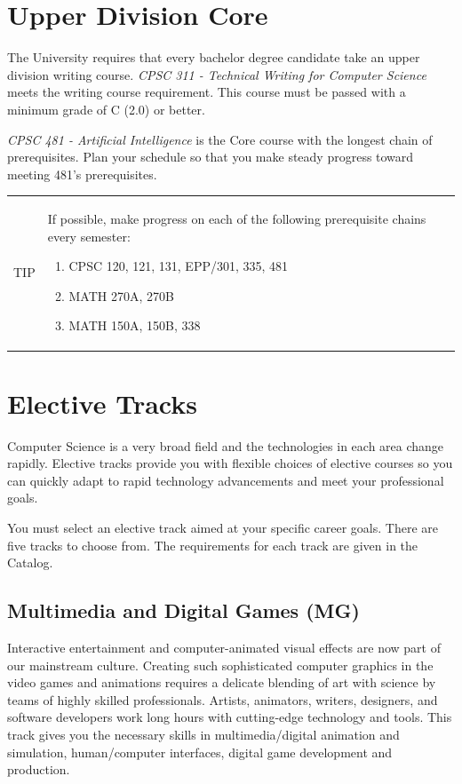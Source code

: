 \documentclass{book}
\newenvironment{tip}{
  \tcolorbox \begin{tabular}{m{.5in} m{5.25in}}
    \Large{TIP} &
}{
  \end{tabular} \endtcolorbox
}
\newcommand{\MgTrackName}{Multimedia and Digital Games (MG)}
\begin{document}
\section{Upper Division Core}

The University requires that every bachelor degree candidate take an upper division writing course. \emph{CPSC 311 - Technical Writing for Computer Science} meets the writing course requirement. This course must be passed with a minimum grade of C (2.0) or better.

\emph{CPSC 481 - Artificial Intelligence} is the Core course with the longest chain of prerequisites. Plan your schedule so that you make steady progress toward meeting 481's prerequisites.

\begin{tip}
  If possible, make progress on each of the following prerequisite chains every semester:
  \begin{enumerate}
  \item CPSC 120, 121, 131, EPP/301, 335, 481
  \item MATH 270A, 270B
  \item MATH 150A, 150B, 338
  \end{enumerate}
\end{tip}

\section{Elective Tracks}
 
Computer Science is a very broad field and the technologies in each area change rapidly. Elective tracks provide you with flexible choices of elective courses so you can quickly adapt to rapid technology advancements and meet your professional goals.

You must select an elective track aimed at your specific career goals. There are five tracks to choose from. The requirements for each track are given in the Catalog.

\subsection{\MgTrackName}
\MgTrackIndex
Interactive entertainment and computer-animated visual effects are now part of our mainstream culture. Creating such sophisticated computer graphics in the video games and animations requires a delicate blending of art with science by teams of highly skilled professionals. Artists, animators, writers, designers, and software developers work long hours with cutting-edge technology and tools. This track gives you the necessary skills in multimedia/digital animation and simulation, human/computer interfaces, digital game development and production.
\end{document}

